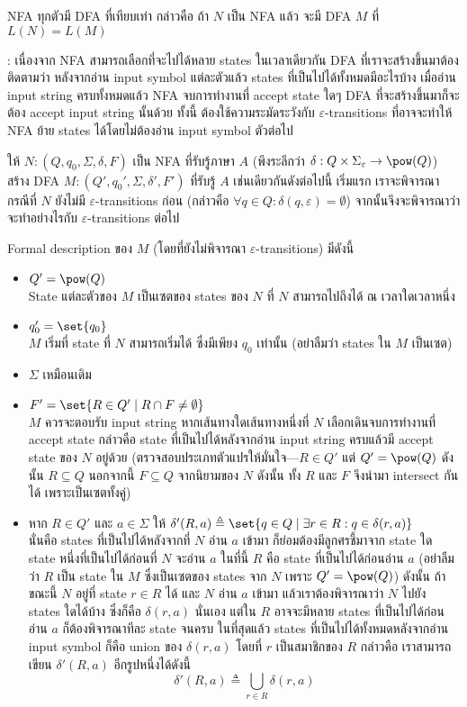 \begin{theorem}\label{thm:equiv-dfa-nfa}
NFA ทุกตัวมี DFA ที่เทียบเท่า กล่าวคือ ถ้า $N$ เป็น NFA แล้ว จะมี DFA $M$ ที่ $L(N)=L(M)$

: เนื่องจาก NFA สามารถเลือกที่จะไปได้หลาย states ในเวลาเดียวกัน DFA ที่เราจะสร้างขึ้นมาต้องติดตามว่า หลังจากอ่าน input symbol แต่ละตัวแล้ว states ที่เป็นไปได้ทั้งหมดมีอะไรบ้าง \enskip เมื่ออ่าน input string ครบทั้งหมดแล้ว NFA จบการทำงานที่ accept state ใดๆ DFA ที่จะสร้างขึ้นมาก็จะต้อง accept input string นั้นด้วย \enskip ทั้งนี้ ต้องใช้ความระมัดระวังกับ $\varepsilon$-transitions ที่อาจจะทำให้ NFA ย้าย states ได้โดยไม่ต้องอ่าน input symbol ตัวต่อไป
\begin{pf}
ให้ $N: (Q,q_0,\Sigma,\delta,F)$ เป็น NFA ที่รับรู้ภาษา $A$ (พึงระลึกว่า $\delta:Q\times\Sigma_\varepsilon\to \pow(Q)$) \enskip สร้าง DFA $M: (Q',q_0',\Sigma,\delta',F')$ ที่รับรู้ $A$ เช่นเดียวกันดังต่อไปนี้ \enskip เริ่มแรก เราจะพิจารณากรณีที่ $N$ ยังไม่มี $\varepsilon$-transitions ก่อน (กล่าวคือ $\forall q\in Q:\delta(q,\varepsilon)=\emptyset$) จากนั้นจึงจะพิจารณาว่าจะทำอย่างไรกับ $\varepsilon$-transitions ต่อไป

Formal description ของ $M$ (โดยที่ยังไม่พิจารณา $\varepsilon$-transitions) มีดังนี้
\begin{itemize}
\item $Q'=\pow(Q)$\\
State แต่ละตัวของ $M$ เป็นเซตของ states ของ $N$ ที่ $N$ สามารถไปถึงได้ ณ เวลาใดเวลาหนึ่ง
\item $q_0'=\set{q_0}$\\
$M$ เริ่มที่ state ที่ $N$ สามารถเริ่มได้ ซึ่งมีเพียง $q_0$ เท่านั้น (อย่าลืมว่า states ใน $M$ เป็นเซต)
\item $\Sigma$ เหมือนเดิม
\item $F'=\set{R\in Q'\mid R\cap F\neq\emptyset}$\\
$M$ ควรจะตอบรับ input string หากเส้นทางใดเส้นทางหนึ่งที่ $N$ เลือกเดินจบการทำงานที่ accept state กล่าวคือ state ที่เป็นไปได้หลังจากอ่าน input string ครบแล้วมี accept state ของ $N$ อยู่ด้วย (ตรวจสอบประเภทตัวแปรให้มั่นใจ---$R\in Q'$ แต่ $Q'=\pow(Q)$ ดังนั้น $R\subseteq Q$ \enskip นอกจากนี้ $F\subseteq Q$ จากนิยามของ $N$ \enskip ดังนั้น ทั้ง $R$ และ $F$ จึงนำมา intersect กันได้ เพราะเป็นเซตทั้งคู่)
\item หาก $R\in Q'$ และ $a\in\Sigma$ ให้ $\delta'(R,a)\triangleq\set{q\in Q\mid\exists r\in R: q\in\delta(r,a)}$\\
นั่นคือ states ที่เป็นไปได้หลังจากที่ $N$ อ่าน $a$ เข้ามา ก็ย่อมต้องมีลูกศรชี้มาจาก state ใด state หนึ่งที่เป็นไปได้ก่อนที่ $N$ จะอ่าน $a$ \enskip ในที่นี้ $R$ คือ state ที่เป็นไปได้ก่อนอ่าน $a$ (อย่าลืมว่า $R$ เป็น state ใน $M$ ซึ่งเป็นเซตของ states จาก $N$ เพราะ $Q'=\pow(Q)$) \enskip ดังนั้น ถ้าขณะนี้ $N$ อยู่ที่ state $r\in R$ ได้ และ $N$ อ่าน $a$ เข้ามา แล้วเราต้องพิจารณาว่า $N$ ไปยัง states ใดได้บ้าง ซึ่งก็คือ $\delta(r,a)$ นั่นเอง \enskip แต่ใน $R$ อาจจะมีหลาย states ที่เป็นไปได้ก่อนอ่าน $a$ ก็ต้องพิจารณาทีละ state จนครบ \enskip ในที่สุดแล้ว states ที่เป็นไปได้ทั้งหมดหลังจากอ่าน input symbol ก็คือ union ของ $\delta(r,a)$ โดยที่ $r$ เป็นสมาชิกของ $R$ \enskip กล่าวคือ เราสามารถเขียน $\delta'(R,a)$ อีกรูปหนึ่งได้ดังนี้ \[\delta'(R,a)\triangleq\bigcup_{r\in R}{\delta(r,a)}\]


\end{itemize}
\end{pf}
\end{theorem}
